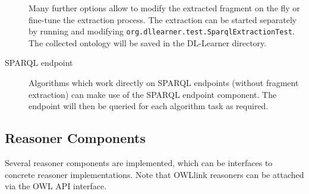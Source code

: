 \documentclass[a4paper,12pt]{scrartcl}
\begin{document}
\begin{description}
\begin{itemize}
\end{itemize}
 Many further options allow to modify the extracted fragment on the fly or fine-tune the extraction process.
The extraction can be started separately by running and modifying \verb|org.dllearner.test.SparqlExtractionTest|. The collected ontology will be saved in the DL-Learner directory.
\item[SPARQL endpoint] Algorithms which work directly on SPARQL endpoints (without fragment extraction) can make use of the SPARQL endpoint component. The endpoint will then be queried for each algorithm task as required.
\end{description}

\subsection{Reasoner Components}

Several reasoner components are implemented, which can be interfaces to concrete reasoner implementations. 
Note that OWLlink reasoners can be attached via the OWL API interface.
\end{document}
